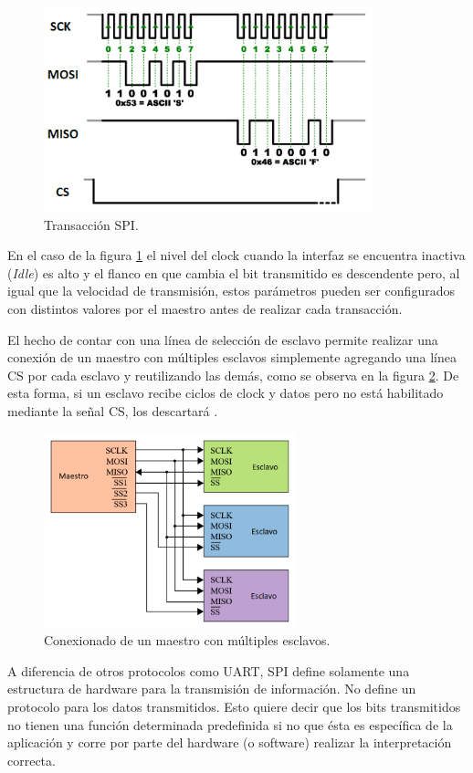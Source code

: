 \begin{figure}[H]
\centering
\includegraphics[width=0.85\textwidth]{./Figures/SPItrans.png}
\caption{Transacción SPI.}
\label{fig:transSPI}
\end{figure}

En el caso de la figura \ref{fig:transSPI} el nivel del clock cuando la interfaz se encuentra inactiva (\textit{Idle}) es alto y el flanco en que cambia el bit transmitido es descendente pero, al igual que la velocidad de transmisión, estos parámetros pueden ser configurados con distintos valores por el maestro antes de realizar cada transacción.

El hecho de contar con una línea de selección de esclavo permite realizar una conexión de un maestro con múltiples esclavos simplemente agregando una línea CS por cada esclavo y reutilizando las demás, como se observa en la figura \ref{fig:multiSlave}. De esta forma, si un esclavo recibe ciclos de clock y datos pero no está habilitado mediante la señal CS, los descartará \citep{WEBSITE:SPI}.

\begin{figure}[H]
\centering
\includegraphics[width=0.65\textwidth]{./Figures/multiSlave.png}
\caption{Conexionado de un maestro con múltiples esclavos.}
\label{fig:multiSlave}
\end{figure}

A diferencia de otros protocolos como UART, SPI define solamente una estructura de hardware para la transmisión de información. No define un protocolo para los datos transmitidos. Esto quiere decir que los bits transmitidos no tienen una función determinada predefinida si no que ésta es específica de la aplicación y corre por parte del hardware (o software) realizar la interpretación correcta.
